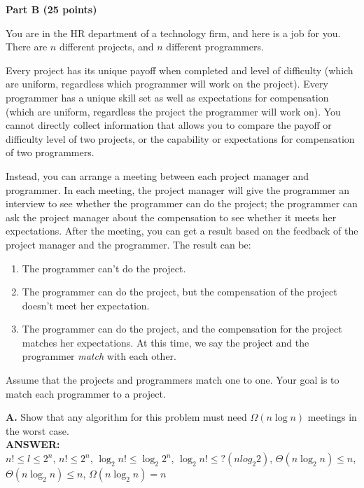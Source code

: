 \documentclass{article}
\begin{document}
\begin{center}
{\bf Part B (25 points)}
\end{center}

 You are in the HR department of a
technology firm, and here is a job for you.  There are $n$ different
projects, and $n$ different programmers.

Every project has its unique payoff when completed and level of
difficulty (which are uniform, regardless which programmer will work
on the project).  Every programmer has a unique skill set as well as
expectations for compensation (which are uniform, regardless the
project the programmer will work on). You cannot directly collect
information that allows you to compare the payoff or difficulty level
of two projects, or the capability or expectations for compensation of
two programmers.

Instead, you can arrange a meeting between each project manager and
programmer.  In each meeting, the project manager will give the
programmer an interview to see whether the programmer can do the
project; the programmer can ask the project manager about the
compensation to see whether it meets her expectations.  After the
meeting, you can get a result based on the feedback of the project
manager and the programmer.  The result can be:

\begin{enumerate}
  \item The programmer can't do the project.
  \item The programmer can do the project, but the compensation of the
    project doesn't meet her expectation.
  \item The programmer can do the project, and the compensation for
    the project matches her expectations. At this time, we say the
    project and the programmer \textit{match} with each other.
\end{enumerate}

Assume that the projects and programmers match one to one. Your goal
is to match each programmer to a project.

{\bf A.} Show that any algorithm for this problem must need $\Omega( n
\log{n} )$ meetings in the worst case.\\
{\bfseries ANSWER: }\\
$n! \le l \le 2^n$, $n! \le 2^n$, $\log_2 n! \leq \log_2 2^n$, $\log_2 n! \leq ?(n log_2 2)$, $\Theta(n \log_2 n) \leq n$, $\Theta(n \log_2 n) \leq n$, $\Omega(n \log_2 n) = n$\\
\end{document}

